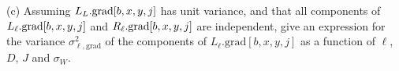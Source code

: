 \documentclass{article}
\newcommand{\solution}[1]{}
\begin{document}
\solution{

\begin{eqnarray*}
\sigma^2_L & = & (1 + D^2J\sigma^2_w)^L \\
\\
& \approx & e^{LD^2J\sigma_W^2}
\end{eqnarray*}

setting
$$e^{LD^2J\sigma_W^2} = 2$$
gives
$$\sigma_w \approx \sqrt{\frac{\ln 2}{LD^2J}}$$
}

\medskip
(c) Assuming $L_L.\mathrm{grad}[b,x,y,j]$ has unit variance, and that all components of $L_\ell.\mathrm{grad}[b,x,y,j]$ and $R_\ell.\mathrm{grad}[b,x,y,j]$ are independent,
give an expression for the variance
$\sigma^2_{\ell,\mathrm{grad}}$ of the components of $L_\ell.\mathrm{grad}[b,x,y,j]$ as a function of $\ell$, $D$, $J$ and $\sigma_W$.
\end{document}
